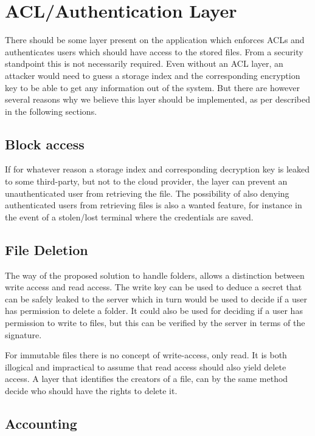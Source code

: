 \documentclass[pdftex,english,10pt,b5paper,twoside]{book}
\begin{document}


\section{ACL/Authentication Layer}

There should be some layer present on the application which enforces \ac{ACL}s
and authenticates users which should have access to the stored files. From a
security standpoint this is not necessarily required. Even without an ACL layer,
an attacker would need to guess a storage index and the corresponding
encryption key to be able to get any information out of the system. But there are
however several reasons why we believe this layer should be implemented, as per
described in the following sections.

\subsection{Block access}
If for whatever reason a storage index and corresponding decryption key is
leaked to some third-party, but not to the cloud provider, the layer can
prevent an unauthenticated user from retrieving the file. The possibility of
also denying authenticated users from retrieving files is also a wanted feature,
for instance in the event of a stolen/lost terminal where the credentials are
saved.

\subsection{File Deletion}

The way of the proposed solution to handle folders, allows a distinction between write
access and read access. The write key can be used to deduce a secret that can
be safely leaked to the server which in turn would be used to decide if a user has
permission to delete a folder. It could also be used for deciding if a user has
permission to write to files, but this can be verified by the server in terms
of the signature.

For immutable files there is no concept of write-access, only read. It is both
illogical and impractical to assume that read access should also yield
delete access. A layer that identifies the creators of a file, can by
the same method decide who should have the rights to delete it. 

\subsection{Accounting}
\end{document}
